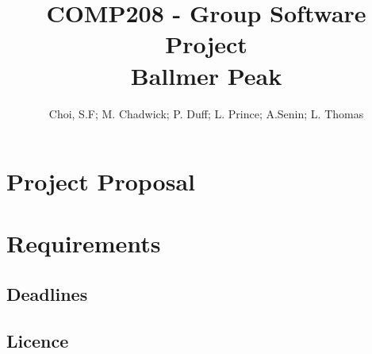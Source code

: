 \documentclass[openany]{book}
\title{COMP208 - Group Software Project\\Ballmer Peak}
\author{Choi, S.F; M. Chadwick; P. Duff; L. Prince; A.Senin; L. Thomas}
\begin{document}
\maketitle
\tableofcontents

\part{Project Proposal}


\part{Requirements}


\begin{appendices}
\appendixpage %
\noappendicestocpagenum %
\addappheadtotoc %

\chapter{Deadlines}

\chapter{Licence}


\end{appendices}

\listoftodos
\todototoc
\end{document}
